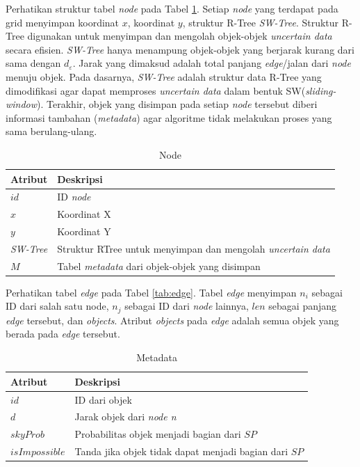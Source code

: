\documentclass[conference]{IEEEtran}
\begin{document}
Perhatikan struktur tabel \textit{node} pada Tabel \ref{tab:node}. Setiap \textit{node} yang terdapat pada grid menyimpan koordinat $ x $, koordinat $ y $, struktur R-Tree \textit{SW-Tree}. Struktur R-Tree digunakan untuk menyimpan dan mengolah objek-objek \textit{uncertain data} secara efisien. \textit{SW-Tree} hanya menampung objek-objek yang berjarak kurang dari sama dengan $ d_\varepsilon $. Jarak yang dimaksud adalah total panjang \textit{edge}/jalan dari \textit{node} menuju objek. Pada dasarnya, \textit{SW-Tree} adalah struktur data R-Tree yang dimodifikasi agar dapat memproses \textit{uncertain data} dalam bentuk SW(\textit{sliding-window}). Terakhir, objek yang disimpan pada setiap \textit{node} tersebut diberi informasi tambahan (\textit{metadata}) agar algoritme tidak melakukan proses yang sama berulang-ulang.

\begin{table}[htbp]
	\caption{Node}
	\begin{center}
		\begin{tabular}{| p{2cm} | p{5cm} |}
			\hline
			\textbf{Atribut} & \textbf{Deskripsi} \\ \hline
			$ id $ & ID \textit{node} \\ \hline
			$ x $ & Koordinat X \\ \hline
			$ y $ & Koordinat Y \\ \hline
			\textit{SW-Tree} & Struktur RTree untuk menyimpan dan mengolah \textit{uncertain data} \\ \hline
			$ M $ & Tabel \textit{metadata} dari objek-objek yang disimpan \\ \hline
		\end{tabular}
		\label{tab:node}
	\end{center}
\end{table}

Perhatikan tabel \textit{edge} pada Tabel \ref{tab:edge}. Tabel \textit{edge} menyimpan $ n_i $ sebagai ID dari salah satu node, $ n_j $ sebagai ID dari \textit{node} lainnya, $ len $ sebagai panjang \textit{edge} tersebut, dan \textit{objects}. Atribut \textit{objects} pada \textit{edge} adalah semua objek yang berada pada \textit{edge} tersebut.

\begin{table}[htbp]
	\caption{Metadata}
	\begin{center}
		\begin{tabular}{| p{2cm} | p{5cm} |}
			\hline
			\textbf{Atribut} & \textbf{Deskripsi} \\ \hline
			$ id $ & ID dari objek \\ \hline
			$ d $ & Jarak objek dari \textit{node n} \\ \hline
			$ skyProb $ & Probabilitas objek menjadi bagian dari $ SP $ \\ \hline
			$ isImpossible $ & Tanda jika objek tidak dapat menjadi bagian dari $ SP $ \\ \hline
		\end{tabular}
		\label{tab:metadata}
	\end{center}
\end{table}
\end{document}
